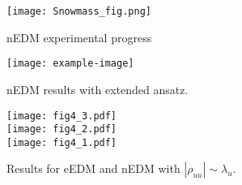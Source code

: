\begin{figure}[p]
    \centering
    \texttt{[image: Snowmass\_fig.png]}
    \caption{nEDM experimental progress~\cite{Snowmass2022EDM}}
    \label{fig:snowmass}
\end{figure}

\begin{figure}[p]
    \centering
    \texttt{[image: example-image]}
    \caption{nEDM results with extended ansatz.}
    \label{fig:nEDM-fixed}
\end{figure}


\begin{figure}[p]
    \centering
    \texttt{[image: fig4\_3.pdf]}\\
    \texttt{[image: fig4\_2.pdf]}\\
    \texttt{[image: fig4\_1.pdf]}
    \caption{Results for eEDM and nEDM with \(|\rho_{uu}| \sim \lambda_{u}\).}
    \label{fig:nEDM-varied}
\end{figure}
